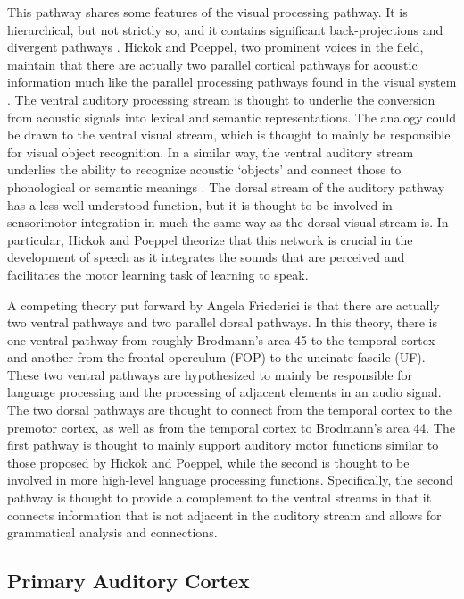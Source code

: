 \documentclass[titlepage]{article}
\begin{document}
  This pathway shares some features of the visual processing pathway. It is
  hierarchical, but not strictly so, and it contains significant
  back-projections and divergent pathways \cite{Webster1992,Hickok2007}.
  Hickok and Poeppel, two prominent voices in the field, maintain that there
  are actually two parallel cortical pathways for acoustic information much
  like the parallel processing pathways found in the visual system
  \cite{Hickok2007,Hickok2004,Hickok2000}. The ventral auditory processing
  stream is thought to underlie the conversion from acoustic signals into
  lexical and semantic representations. The analogy could be drawn to the
  ventral visual stream, which is thought to mainly be responsible for visual
  object recognition. In a similar way, the ventral auditory stream underlies
  the ability to recognize acoustic `objects' and connect those to phonological
  or semantic meanings \cite{Parker2005,Rauschecker2009}. The dorsal stream of
  the auditory pathway has a less well-understood function, but it is thought
  to be involved in sensorimotor integration in much the same way as the dorsal
  visual stream is. In particular, Hickok and Poeppel theorize that this
  network is crucial in the development of speech as it integrates the sounds
  that are perceived and facilitates the motor learning task of learning to
  speak.

  A competing theory put forward by Angela Friederici \cite{Friederici2011} is
  that there are actually two ventral pathways and two parallel dorsal pathways.
  In this theory, there is one ventral pathway from roughly Brodmann's area 45
  to the temporal cortex and another from the frontal operculum (FOP) to the
  uncinate fascile (UF). These two ventral pathways are hypothesized to mainly
  be responsible for language processing and the processing of adjacent elements
  in an audio signal. The two dorsal pathways are thought to connect from the
  temporal cortex to the premotor cortex, as well as from the temporal cortex
  to Brodmann's area 44. The first pathway is thought to mainly support
  auditory motor functions similar to those proposed by Hickok and Poeppel,
  while the second is thought to be involved in more high-level language
  processing functions. Specifically, the second pathway is thought to provide
  a complement to the ventral streams in that it connects information that
  is not adjacent in the auditory stream and allows for grammatical analysis
  and connections.

  \subsection{Primary Auditory Cortex} \label{primaryAuditoryCortex}
\end{document}

